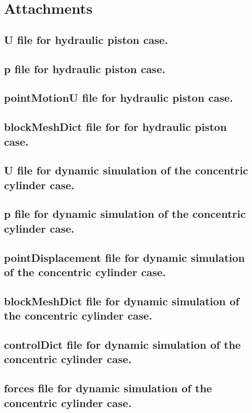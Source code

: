 \section{Attachments}
	\label{sec:attachments}

\subsection{U file for hydraulic piston case.}
\subsection{p file for hydraulic piston case.}
\subsection{pointMotionU file for hydraulic piston case.}
\subsection{blockMeshDict file for for hydraulic piston case.}

\subsection{U file for dynamic simulation of the concentric cylinder case.}
\subsection{p file for dynamic simulation of the concentric cylinder case.}
\subsection{pointDisplacement file for dynamic simulation of the concentric cylinder case.}
\subsection{blockMeshDict file for dynamic simulation of the concentric cylinder case.}
\subsection{controlDict file for dynamic simulation of the concentric cylinder case.}
\subsection{forces file for dynamic simulation of the concentric cylinder case.}

